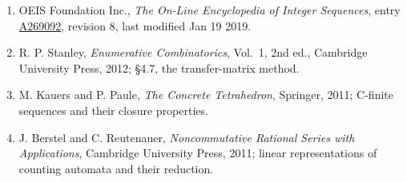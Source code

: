 \documentclass[11pt]{article}
\theoremstyle{definition}
\begin{document}
\begin{enumerate}

\item OEIS Foundation Inc., \emph{The On-Line Encyclopedia of Integer Sequences}, entry \href{https://oeis.org/A269092}{A269092}, revision 8, last modified Jan 19 2019.

\item R. P. Stanley, \emph{Enumerative Combinatorics}, Vol.~1, 2nd ed., Cambridge University Press, 2012; \S4.7, the transfer-matrix method.

\item M. Kauers and P. Paule, \emph{The Concrete Tetrahedron}, Springer, 2011; C-finite sequences and their closure properties.

\item J. Berstel and C. Reutenauer, \emph{Noncommutative Rational Series with Applications}, Cambridge University Press, 2011; linear representations of counting automata and their reduction.

\end{enumerate}
\end{document}
